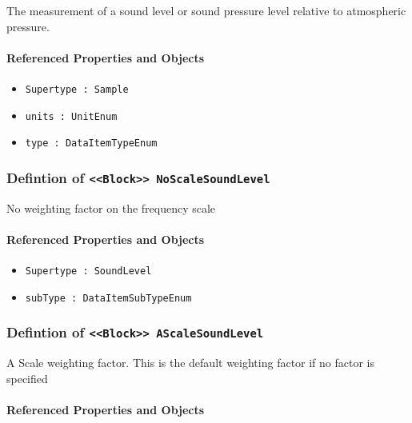 \FloatBarrier

The measurement of a sound level or sound pressure level relative to atmospheric pressure.

\FloatBarrier
\paragraph{Referenced Properties and Objects}

\begin{itemize}
\item \texttt{Supertype : Sample}

\item \texttt{units : UnitEnum}

\item \texttt{type : DataItemTypeEnum}

\end{itemize}
\FloatBarrier
\subsubsection{Defintion of \texttt{<<Block>> NoScaleSoundLevel}}
  \label{type:NoScaleSoundLevel}

\FloatBarrier

No weighting factor on the frequency scale

\FloatBarrier
\paragraph{Referenced Properties and Objects}

\begin{itemize}
\item \texttt{Supertype : SoundLevel}

\item \texttt{subType : DataItemSubTypeEnum}

\end{itemize}
\FloatBarrier
\subsubsection{Defintion of \texttt{<<Block>> AScaleSoundLevel}}
  \label{type:AScaleSoundLevel}

\FloatBarrier

A Scale weighting factor.   This is the default weighting factor if no factor is specified

\FloatBarrier
\paragraph{Referenced Properties and Objects}

